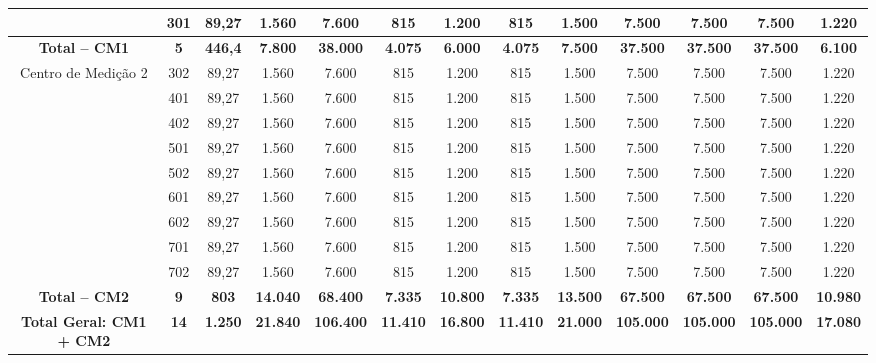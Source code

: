 \documentclass[12pt,openright,oneside,a4paper,brazil]{abntex2}
\begin{document}
\begin{table}[H]
\begin{sideways}
\begin{minipage}{\textheight}
{\begin{tabular}{c | c c c c c c c c c c c c}
        & 301 & 89,27 & 1.560 & 7.600 & 815 & 1.200 & 815 & 1.500 & 7.500 & 7.500 & 7.500 & 1.220 \\
        \hline
        \rowcolor[HTML]{fde6c7}
        \textbf{Total -- CM1} & \textbf{5} & \textbf{446,4} & \textbf{7.800} & \textbf{38.000} & \textbf{4.075} & \textbf{6.000} & \textbf{4.075} & \textbf{7.500} & \textbf{37.500} & \textbf{37.500} & \textbf{37.500} & \textbf{6.100} \\
        \hline
        \multirow{9}{*}{Centro de Medi\c{c}\~ao 2}
        & 302 & 89,27 & 1.560 & 7.600 & 815 & 1.200 & 815 & 1.500 & 7.500 & 7.500 & 7.500 & 1.220 \\
        & 401 & 89,27 & 1.560 & 7.600 & 815 & 1.200 & 815 & 1.500 & 7.500 & 7.500 & 7.500 & 1.220 \\
        & 402 & 89,27 & 1.560 & 7.600 & 815 & 1.200 & 815 & 1.500 & 7.500 & 7.500 & 7.500 & 1.220 \\
        & 501 & 89,27 & 1.560 & 7.600 & 815 & 1.200 & 815 & 1.500 & 7.500 & 7.500 & 7.500 & 1.220 \\
        & 502 & 89,27 & 1.560 & 7.600 & 815 & 1.200 & 815 & 1.500 & 7.500 & 7.500 & 7.500 & 1.220 \\
        & 601 & 89,27 & 1.560 & 7.600 & 815 & 1.200 & 815 & 1.500 & 7.500 & 7.500 & 7.500 & 1.220 \\
        & 602 & 89,27 & 1.560 & 7.600 & 815 & 1.200 & 815 & 1.500 & 7.500 & 7.500 & 7.500 & 1.220 \\
        & 701 & 89,27 & 1.560 & 7.600 & 815 & 1.200 & 815 & 1.500 & 7.500 & 7.500 & 7.500 & 1.220 \\
        & 702 & 89,27 & 1.560 & 7.600 & 815 & 1.200 & 815 & 1.500 & 7.500 & 7.500 & 7.500 & 1.220 \\
        \hline
        \rowcolor[HTML]{fde6c7}
        \textbf{Total -- CM2} & \textbf{9} & \textbf{803} & \textbf{14.040} & \textbf{68.400} & \textbf{7.335} & \textbf{10.800} & \textbf{7.335} & \textbf{13.500} & \textbf{67.500} & \textbf{67.500} & \textbf{67.500} & \textbf{10.980} \\
        \hline \rowcolor[HTML]{ffc187}
        \textbf{Total Geral: CM1 + CM2} & \textbf{14} & \textbf{1.250} & \textbf{21.840} & \textbf{106.400} & \textbf{11.410} & \textbf{16.800} & \textbf{11.410} & \textbf{21.000} & \textbf{105.000} & \textbf{105.000} & \textbf{105.000} & \textbf{17.080} \\
        \bottomrule

        \end{tabular}%
        }
        
        
        \vspace{0.15cm}
    \end{minipage}
\end{sideways}

\end{table}
\end{document}

